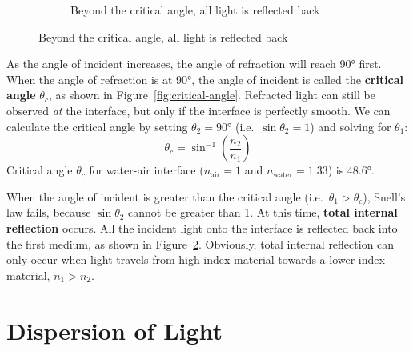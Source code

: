 \begin{figure}[ht]
\begin{subfigure}[t]{.32\linewidth}
    \caption{Beyond the critical angle, all light is reflected back}
    \label{fig:TIR}
  \end{subfigure}
\end{figure}
As the angle of incident increases, the angle of refraction will reach \ang{90}
first. When the angle of refraction is at \ang{90}, the angle of incident is
called the \textbf{critical angle} $\theta_c$, as shown in
Figure~\ref{fig:critical-angle}. Refracted light can still be observed
\emph{at} the interface, but only if the interface is perfectly smooth. We can
calculate the critical angle by setting $\theta_2=\ang{90}$ (i.e.\
$\sin\theta_2=1$) and solving for $\theta_1$:
\begin{equation}
  \boxed{
    \theta_c=\sin^{-1}\left(\frac{n_2}{n_1}\right)
  }
\end{equation}
Critical angle $\theta_c$ for water-air interface ($n_\text{air}=1$ and
$n_\text{water}=1.33$) is \ang{48.6}.

When the angle of incident is greater than the critical angle (i.e.\
$\theta_1>\theta_c$), Snell's law fails, because $\sin\theta_2$ cannot be
greater than 1. At this time, \textbf{total internal reflection} occurs. All
the incident light onto the interface is reflected back into the first medium,
as shown in Figure~\ref{fig:TIR}. Obviously, total internal reflection can only
occur when light travels from high index material towards a lower index
material, $n_1>n_2$.



\section{Dispersion of Light}
%



